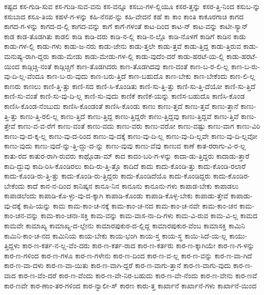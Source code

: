 {ಕಷ್ಟದ
ಕಸ-ಗುಡಿ-ಸುವ
ಕಸ-ಗುಡಿ-ಸುವ-ವನು
ಕಸ-ವನ್ನೂ
ಕಸಬು-ಗಳ-ಲ್ಲಿಯೂ
ಕಸರ-ತ್ತನ್ನು
ಕಸರ-ತ್ತಿ-ನಿಂದ
ಕಸುಬ-ನ್ನು
ಕಸುಬಾದ
ಕಸೂ-ತಿಯ
ಕಹಳೆ-ಗ-ಳನ್ನು
ಕಹಿ-ನೆನಪ-ನ್ನು
ಕಹಿ-ವೇದನೆ
ಕಹೆ
ಕಾ
ಕಾಂ
ಕಾಂತಿ
ಕಾಕೂರಗಾಚಿ
ಕಾಗದ
ಕಾಗದ-ಗ-ಳನ್ನು
ಕಾಗದ-ದ-ಲ್ಲಿ
ಕಾಗದ-ವನ್ನು
ಕಾಗೆ
ಕಾಗೆ-ಗಳಂತೆ
ಕಾಟ-ದಿಂದ
ಕಾಟ-ನ್
ಕಾಟ-ವನ್ನು
ಕಾಟೀ-ಸ್ಯಾನ್
ಕಾಡ
ಕಾಡ-ತೊಡಗಿತು
ಕಾಡಲಿ
ಕಾಡಿ
ಕಾಡಿ-ದರು
ಕಾಡಿ-ನ-ಲ್ಲಿ
ಕಾಡಿ-ನ-ಲ್ಲೊ
ಕಾಡಿ-ನೊಳಗೆ
ಕಾಡಿಗೆ
ಕಾಡಿನ
ಕಾಡು
ಕಾಡು-ಗಳ-ಲ್ಲಿ
ಕಾಡು-ಗಳು
ಕಾಡು-ಜ-ನರು
ಕಾಡು-ಜೇನು
ಕಾಡು-ತ್ತಲೇ
ಕಾಡು-ತ್ತವೆ
ಕಾಡು-ತ್ತಿದ್ದ
ಕಾಡು-ತ್ತಿರುವ
ಕಾಡು-ಮನುಷ್ಯ-ರಾಗಿ-ದ್ದರು
ಕಾಡು-ಮೇಡು
ಕಾಡು-ಮೇಡು-ಗಳ-ಲ್ಲಿ
ಕಾಡು-ವುದೆಂ-ದರೆ
ಕಾಡು-ಹರಟೆ-ಯ-ಲ್ಲಿ
ಕಾಡು-ಹರಟೆ-ಯಿಂದ
ಕಾಡ್ಗಿಚ್ಚಿ-ನಂತೆ
ಕಾಡ್ಗಿಚ್ಚಿಗೆ
ಕಾಣ-ತೊಡಗಿದರು
ಕಾಣ-ತೊಡಗಿದವು
ಕಾಣ-ದಂತೆ
ಕಾಣ-ಬ-ರ-ಲಿ-ಲ್ಲ
ಕಾಣ-ಬ-ರು-ವು-ದಿ-ಲ್ಲ-ವೆಂದೂ
ಕಾಣ-ಬ-ರು-ವುದು
ಕಾಣ-ಬರು-ತ್ತಿದೆ
ಕಾಣ-ಬಹುದೊ
ಕಾಣ-ಬೇಕು
ಕಾಣ-ಬೇಕೆಂದು
ಕಾಣ-ಲಿ-ಲ್ಲ
ಕಾಣರು
ಕಾಣಲು
ಕಾಣಿ-ತ್ತಿ-ತ್ತು
ಕಾಣಿ-ಸದ
ಕಾಣಿ-ಸಿ-ಕೊಂಡಿತು
ಕಾಣಿ-ಸು-ತ್ತಿ-ತ್ತು
ಕಾಣಿ-ಸು-ತ್ತಿ-ದೆಯೋ
ಕಾಣಿ-ಸು-ತ್ತಿದೆ
ಕಾಣಿ-ಸು-ವಂತೆ
ಕಾಣಿ-ಸು-ವು-ದಿ-ಲ್ಲ
ಕಾಣಿ-ಸು-ವುದು
ಕಾಣಿಕೆ
ಕಾಣಿಕೆ-ಯನ್ನು
ಕಾಣಿಸ-ಬಹುದೊ
ಕಾಣಿಸಿ-ಕೊಂಡ
ಕಾಣಿಸಿ-ಕೊಂಡ-ನೆಂಬುದು
ಕಾಣಿಸಿ-ಕೊಂಡಂತೆ
ಕಾಣಿಸಿ-ಕೊಂಡು
ಕಾಣು
ಕಾಣು-ತ್ತದೆ
ಕಾಣು-ತ್ತವೆ
ಕಾಣು-ತ್ತಾನೆ
ಕಾಣು-ತ್ತಿ-ತ್ತು
ಕಾಣು-ತ್ತಿ-ರಲಿ-ಲ್ಲ
ಕಾಣು-ತ್ತಿದೆ
ಕಾಣು-ತ್ತಿದ್ದ
ಕಾಣು-ತ್ತಿದ್ದರೇ
ಕಾಣು-ತ್ತಿದ್ದವು
ಕಾಣು-ತ್ತಿದ್ದವೆ
ಕಾಣು-ತ್ತಿವೆ
ಕಾಣು-ತ್ತೇವೆ
ಕಾಣು-ವ-ವ-ರೆಗೆ
ಕಾಣು-ವಂತೆ
ಕಾಣು-ವದು
ಕಾಣು-ವರು
ಕಾಣು-ವರೋ
ಕಾಣು-ವಷ್ಟು
ಕಾಣು-ವಾಗ
ಕಾಣು-ವಿರಿ
ಕಾಣು-ವು-ದ-ಕ್ಕ-ಲ್ಲ
ಕಾಣು-ವು-ದ-ರಿಂದ
ಕಾಣು-ವು-ದಕ್ಕೆ
ಕಾಣು-ವು-ದಿ-ಲ್ಲ
ಕಾಣು-ವು-ದಿ-ಲ್ಲವೇ
ಕಾಣು-ವು-ದಿ-ಲ್ಲವೋ
ಕಾಣು-ವುದು
ಕಾಣು-ವುದೆ-ನ್ನು-ತ್ತಿ-ದ್ದು-ದ-ನ್ನು
ಕಾಣು-ವುವು
ಕಾಣು-ವೆವು
ಕಾಣುವ
ಕಾಣೆ
ಕಾತ-ರರಾಗು-ವಿ-ರ-ಲ್ಲ
ಕಾತು-ರದ
ಕಾತುರ-ರಾಗಿ-ರುವರು
ಕಾಥ್ಗೊಡಾ-ಮ್
ಕಾದ
ಕಾದಂ-ಬರಿ-ಗ-ಳನ್ನು
ಕಾದಾ-ಡು-ತ್ತಿದ್ದರು
ಕಾದಾಡು-ತ್ತಾರೆ
ಕಾದಿ-ದ್ದುವು
ಕಾದಿ-ರಿಸಿ-ಕೊಂಡಿರಲು
ಕಾದಿ-ರು-ತ್ತಿ-ತ್ತೊ
ಕಾದಿದೆ
ಕಾದು
ಕಾದು-ಕೊಂಡಿ-ತ್ತು
ಕಾದು-ಕೊಂಡಿ-ರಲಾರೆ
ಕಾದು-ಕೊಂಡಿ-ರು-ತ್ತಿ-ತ್ತು
ಕಾದು-ಕೊಂಡಿ-ರು-ತ್ತಿದ್ದರು
ಕಾದು-ಕೊಂಡಿದೆಯೊ
ಕಾದು-ಕೊಂಡಿದ್ದರು
ಕಾದು-ಕೊಂಡಿರ-ಬೇಕೆಂದು
ಕಾದೆ
ಕಾನ-ನ-ದಿಂದ
ಕಾನಿಷ್ಕನ
ಕಾನೂ-ನಿನ
ಕಾನೂನು
ಕಾನೂನು-ಗಳು
ಕಾಪಾಡ-ಬೇಕು
ಕಾಪಾಡಲು
ಕಾಪಾಡಲೆಂದು
ಕಾಪಾಡಿ-ಕೊ-ಳ್ಳು-ವು-ದ-ಕ್ಕಾಗಿ
ಕಾಪಾಡಿ-ಕೊಂಡು
ಕಾಪಾಡಿ-ಕೊಳ್ಳ-ಬೇಕು
ಕಾಪಾಡು-ತ್ತೇವೆ
ಕಾಪಾಡು-ವು-ದಕ್ಕೆ
ಕಾಪಿ-ಯನ್ನು
ಕಾಮ
ಕಾಮ-ಕಾಂ-ಚ-ನಕ್ಕೆ
ಕಾಮ-ಕಾಂ-ಚ-ನದ
ಕಾಮ-ಕಾಂ-ಚ-ನವೇ
ಕಾಮ-ಕಾಂ-ಚನ
ಕಾಮ-ಕಾಂ-ಚನ-ವನ್ನು
ಕಾಮ-ಕಾಂ-ಚನಾ-ಸಕ್ತಿ
ಕಾಮ-ವನ್ನು
ಕಾಮ-ವಾಸ-ನಾ-ದಿ-ಗಳು
ಕಾಮ-ವಿ-ರುವ
ಕಾಮ-ವಿ-ಲ್ಲ
ಕಾಮದ
ಕಾಮವೇ
ಕಾಮಾಖ್ಯ
ಕಾಮಾಖ್ಯ-ದ-ಲ್ಲೇನು
ಕಾಮಾರಪುಕುರ-ದ-ಲ್ಲಿದ್ದ
ಕಾಮಾರಪುಕುರ-ವೆಂಬ
ಕಾಮಾಸಕ್ತಿ
ಕಾಮಿನಿ
ಕಾಮಿನಿ-ಕಾಂ-ಚ-ನದ
ಕಾಮಿನಿಯ
ಕಾಯ-ಬೇಕು
ಕಾಯ-ಭಂಗಿ
ಕಾಯ-ಸ್ತ
ಕಾಯ-ಸ್ಥ
ಕಾಯಿ-ಸಿದೆ-ಯ-ಲ್ಲ
ಕಾಯು-ತ್ತಿದ್ದಳು
ಕಾರ-ಣ-ಕರ್ತ-ನ-ಲ್ಲ-ವೆಂ-ದರು
ಕಾರ-ಣ-ಕರ್ತ-ರಾದ
ಕಾರ-ಣ-ಕರ್ತರು
ಕಾರ-ಣ-ಕ್ಕಾಗಿಯೇ
ಕಾರ-ಣ-ಗ-ಳನ್ನು
ಕಾರ-ಣ-ಗಳಿಂದ
ಕಾರ-ಣ-ಗಳೂ
ಕಾರ-ಣ-ಗಳೇನು
ಕಾರ-ಣ-ದಿಂದ
ಕಾರ-ಣ-ವ-ಲ್ಲ
ಕಾರ-ಣ-ವನ್ನು
ಕಾರ-ಣ-ವಾ-ಗಿದೆ
ಕಾರ-ಣ-ವಾ-ದಳು
ಕಾರ-ಣ-ವಾ-ಯಿತು
ಕಾರ-ಣ-ವಾಗಿ-ದ್ದರೆ
ಕಾರ-ಣ-ವಾಗು-ತ್ತಾನೆ
ಕಾರ-ಣ-ವಾಗು-ವುದು
ಕಾರ-ಣ-ವಾದ
ಕಾರ-ಣ-ವೆಂ-ದರೆ
ಕಾರ-ಣ-ವೆಂದು
ಕಾರ-ಣ-ವೇ-ನಿರ-ಬಹುದು
ಕಾರ-ಣ-ವೇ-ನೆಂದು
ಕಾರ-ಣ-ವೇನು
ಕಾರ-ಣವೆ
ಕಾರ-ಣವೇ
ಕಾರ-ಣಾಂ-ತರ-ಗಳಿಂದ
ಕಾರ-ನ್ವಾಲೀ-ಸ್
ಕಾರಣ
ಕಾರು-ತ್ತ
ಕಾರ್ಖಾನೆ
ಕಾರ್ಖಾನೆ-ಗಳು
ಕಾರ್ಖಾನೆ-ಯಿಂದ
}
